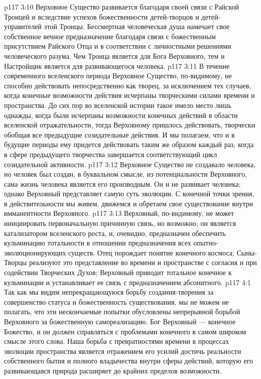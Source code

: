 \vs p117 3:10 Верховное Существо развивается благодаря своей связи с Райской Троицей и вследствие успехов божественности детей\hyp{}творцов и детей\hyp{}управителей этой Троицы. Бессмертная человеческая душа намечает свое собственное вечное предназначение благодаря связи с божественным присутствием Райского Отца и в соответствии с личностными решениями человеческого разума. Чем Троица является для Бога Верховного, тем и Настройщик является для развивающегося человека.
\vs p117 3:11 \pc В течение современного вселенского периода Верховное Существо, по\hyp{}видимому, не способно действовать непосредственно как творец, за исключением тех случаев, когда конечные возможности действия исчерпаны творческими силами времени и пространства. До сих пор во вселенской истории такое имело место лишь однажды, когда были исчерпаны возможности конечных действий в области вселенской отражательности, тогда Верховному пришлось действовать, творчески обобщая все предыдущие созидательные действия. И мы полагаем, что и в будущие периоды ему придется действовать таким же образом каждый раз, когда в сфере предыдущего творчества завершается соответствующий цикл созидательной активности.
\vs p117 3:12 Верховное Существо не создавало человека, но человек был создан, в буквальном смысле, из потенциальности Верховного, сама жизнь человека является его производным. Он и не развивает человека; однако Верховный представляет самую суть эволюции. С конечной точки зрения, в действительности мы живем, движемся и обретаем свое существование внутри имманентности Верховного.
\vs p117 3:13 Верховный, по\hyp{}видимому, не может инициировать первоначальную причинную связь, но возможно, он является катализатором вселенского роста, и, очевидно, предназначен обеспечить кульминацию тотальности в отношении предназначения всех опытно\hyp{}эволюционирующих существ. Отец порождает понятие конечного космоса; Сыны\hyp{}Творцы реализуют это представление во времени и пространстве с согласия и при содействии Творческих Духов; Верховный приводит тотальное конечное к кульминации и устанавливает ее связь с предназначением абсонитного.
\vs p117 4:1 Так как мы видим непрекращающуюся борьбу создания\hyp{}творения за совершенство статуса и божественность существования, мы не можем не полагать, что эти нескончаемые попытки обусловлены непрерывной борьбой Верховного за божественную самореализацию. Бог Верховный --- конечное Божество, и он должен справляться с проблемами конечного в самом широком смысле этого слова. Наша борьба с превратностями времени в процессах эволюции пространства является отражением его усилий достичь реальности собственного бытия и полного владычества внутри сферы действий, которую его развивающаяся природа расширяет до крайних пределов возможности.
